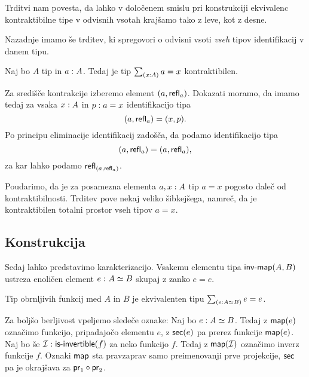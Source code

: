 Trditvi nam povesta, da lahko v določenem smislu pri konstrukciji ekvivalenc kontraktibilne tipe v odvisnih vsotah krajšamo tako z leve, kot z desne.

Nazadnje imamo še trditev, ki spregovori o odvisni vsoti \emph{vseh} tipov identifikacij v danem tipu.

\begin{trditev}
  \label{cover-contr}
  Naj bo \(A\) tip in \(a : A\). Tedaj je tip \(\textstyle \sum_{\left( x : A \right)} a = x\) kontraktibilen.
\end{trditev}

\begin{dokaz}
  Za središče kontrakcije izberemo element \((a, \textnormal{\textsf{refl}}_{a})\). Dokazati moramo, da imamo tedaj za vsaka \(x : A\) in \(p : a = x\) identifikacijo tipa
  \[(a, \textnormal{\textsf{refl}}_{a}) = (x, p).\]
  Po principu eliminacije identifikacij zadošča, da podamo identifikacijo tipa
  \[(a, \textnormal{\textsf{refl}}_{a}) = (a, \textnormal{\textsf{refl}}_{a}),\] za kar lahko podamo \(\textnormal{\textsf{refl}}_{(a, \textnormal{\textsf{refl}}_{a})}\).
\end{dokaz}

Poudarimo, da je za posamezna elementa \(a, x : A\) tip \(a = x\) pogosto daleč od kontraktibilnosti. Trditev pove nekaj veliko šibkejšega, namreč, da je kontraktibilen totalni prostor vseh tipov \(a = x\).

\subsection{Konstrukcija}

Sedaj lahko predstavimo karakterizacijo. Vsakemu elementu tipa \(\textnormal{\textsf{inv-map}}(A, B)\) ustreza enoličen element \(e \,\colon A \simeq B\) skupaj z zanko \(e = e\).

\begin{trditev}
  \label{main-char}
  Tip obrnljivih funkcij med \(A\) in \(B\) je ekvivalenten tipu \(\textstyle \sum_{\left( e : A \simeq B \right)} e = e\).
\end{trditev}

Za boljšo berljivost vpeljemo sledeče oznake: Naj bo \(e : A \simeq B\). Tedaj z \(\textnormal{\textsf{map}}(e)\) označimo funkcijo, pripadajočo elementu \(e\), z \(\textnormal{\textsf{sec}}(e)\) pa prerez funkcije \(\textnormal{\textsf{map}}(e)\). Naj bo še \(\mathcal{I} : \textnormal{\textsf{is-invertible}}(f)\) za neko funkcijo \(f\). Tedaj z \(\textnormal{\textsf{map}}(\mathcal{I})\) označimo inverz funkcije \(f\). Oznaki \(\textnormal{\textsf{map}}\) sta pravzaprav samo preimenovanji prve projekcije, \(\textnormal{\textsf{sec}}\) pa je okrajšava za \(\textnormal{\textsf{pr}}_{1} \circ \textnormal{\textsf{pr}}_{2}\).

